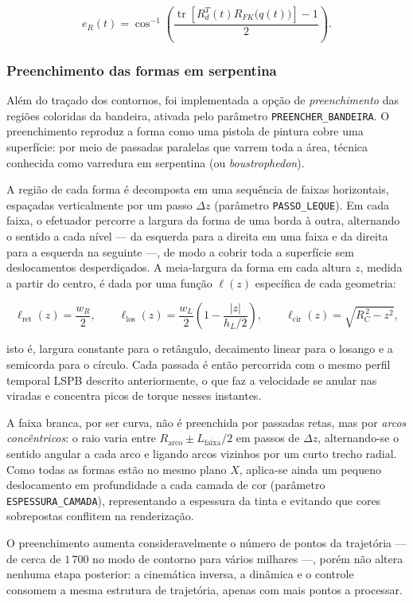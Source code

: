 \[
e_R(t)=
\cos^{-1}
\left(
\frac{
\operatorname{tr}\!\left[R_d^T(t)R_{FK}\bigl(q(t)\bigr)\right]-1
}{2}
\right).
\]

\subsubsection{Preenchimento das formas em serpentina}

Além do traçado dos contornos, foi implementada a opção de \emph{preenchimento}
das regiões coloridas da bandeira, ativada pelo parâmetro
\texttt{PREENCHER\_BANDEIRA}. O preenchimento reproduz a forma como uma pistola de
pintura cobre uma superfície: por meio de passadas paralelas que varrem toda a
área, técnica conhecida como varredura em serpentina (ou \textit{boustrophedon}).

A região de cada forma é decomposta em uma sequência de faixas horizontais,
espaçadas verticalmente por um passo $\Delta z$ (parâmetro \texttt{PASSO\_LEQUE}).
Em cada faixa, o efetuador percorre a largura da forma de uma borda à outra,
alternando o sentido a cada nível --- da esquerda para a direita em uma faixa e da
direita para a esquerda na seguinte ---, de modo a cobrir toda a superfície sem
deslocamentos desperdiçados. A meia-largura da forma em cada altura $z$, medida a
partir do centro, é dada por uma função $\ell(z)$ específica de cada geometria:

\[
\ell_{\text{ret}}(z)=\frac{w_R}{2},
\qquad
\ell_{\text{los}}(z)=\frac{w_L}{2}\left(1-\frac{|z|}{h_L/2}\right),
\qquad
\ell_{\text{cir}}(z)=\sqrt{R_C^{\,2}-z^2},
\]

isto é, largura constante para o retângulo, decaimento linear para o losango e a
semicorda para o círculo. Cada passada é então percorrida com o mesmo perfil
temporal LSPB descrito anteriormente, o que faz a velocidade se anular nas viradas
e concentra picos de torque nesses instantes.

A faixa branca, por ser curva, não é preenchida por passadas retas, mas por
\emph{arcos concêntricos}: o raio varia entre $R_{\text{arco}}\pm L_{\text{faixa}}/2$
em passos de $\Delta z$, alternando-se o sentido angular a cada arco e ligando arcos
vizinhos por um curto trecho radial. Como todas as formas estão no mesmo plano $X$,
aplica-se ainda um pequeno deslocamento em profundidade a cada camada de cor
(parâmetro \texttt{ESPESSURA\_CAMADA}), representando a espessura da tinta e evitando
que cores sobrepostas conflitem na renderização.

O preenchimento aumenta consideravelmente o número de pontos da trajetória --- de
cerca de $1\,700$ no modo de contorno para vários milhares ---, porém não altera
nenhuma etapa posterior: a cinemática inversa, a dinâmica e o controle consomem a
mesma estrutura de trajetória, apenas com mais pontos a processar.

